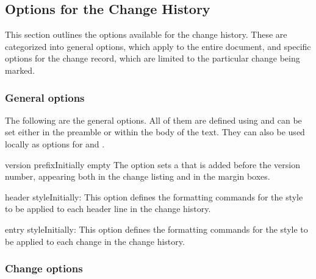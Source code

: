 \documentclass[11pt]{article}
\begin{document}
\begin{PDListing}
    \PDPrintChanges[version prefix = {V}]
\end{PDListing}

\subsection{Options for the Change History}\label{sec:options-change-history}

This section outlines the options available for the change history. These are categorized into general options, which apply to the entire document, and specific options for the change record, which are limited to the particular change being marked.

\subsubsection{General options}

The following are the general options. All of them are defined using  and can be set either in the preamble or within the body of the text. They can also be used locally as options for  and .

\begin{Optiondef}{version prefix}{}{Initially empty}
    The  option sets a  that is added before the version number, appearing both in the change listing and in the margin boxes.
\end{Optiondef}

\begin{Optiondef}{header style}{}{Initially: }
    This option defines the formatting commands for the style to be applied to each header line in the change history.
\end{Optiondef}

\begin{Optiondef}{entry style}{}{Initially: }
    This option defines the formatting commands for the style to be applied to each change in the change history.
\end{Optiondef}

\subsubsection{Change options}\label{sec:change-options}
\end{document}
